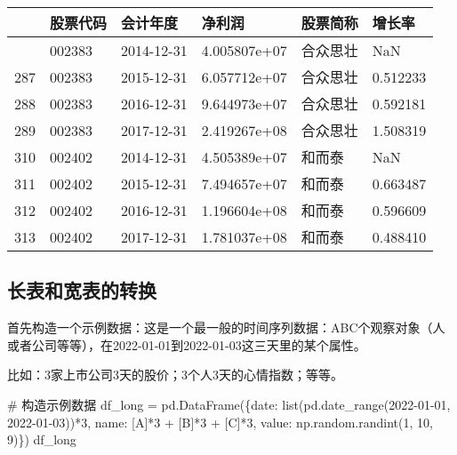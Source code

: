 \documentclass[
  letterpaper,
  DIV=11,
  numbers=noendperiod]{scrreprt}
\newenvironment{Shaded}{\begin{snugshade}}{\end{snugshade}}
\newcommand{\BuiltInTok}[1]{\textcolor[rgb]{0.00,0.23,0.31}{#1}}
\newcommand{\CommentTok}[1]{\textcolor[rgb]{0.37,0.37,0.37}{#1}}
\newcommand{\DecValTok}[1]{\textcolor[rgb]{0.68,0.00,0.00}{#1}}
\newcommand{\NormalTok}[1]{\textcolor[rgb]{0.00,0.23,0.31}{#1}}
\newcommand{\OperatorTok}[1]{\textcolor[rgb]{0.37,0.37,0.37}{#1}}
\newcommand{\StringTok}[1]{\textcolor[rgb]{0.13,0.47,0.30}{#1}}
\begin{document}
\begin{longtable}[]{@{}llllll@{}}
\toprule\noalign{}
& 股票代码 & 会计年度 & 净利润 & 股票简称 & 增长率 \\
\midrule\noalign{}
\endhead
\bottomrule\noalign{}
\endlastfoot
286 & 002383 & 2014-12-31 & 4.005807e+07 & 合众思壮 & NaN \\
287 & 002383 & 2015-12-31 & 6.057712e+07 & 合众思壮 & 0.512233 \\
288 & 002383 & 2016-12-31 & 9.644973e+07 & 合众思壮 & 0.592181 \\
289 & 002383 & 2017-12-31 & 2.419267e+08 & 合众思壮 & 1.508319 \\
310 & 002402 & 2014-12-31 & 4.505389e+07 & 和而泰 & NaN \\
311 & 002402 & 2015-12-31 & 7.494657e+07 & 和而泰 & 0.663487 \\
312 & 002402 & 2016-12-31 & 1.196604e+08 & 和而泰 & 0.596609 \\
313 & 002402 & 2017-12-31 & 1.781037e+08 & 和而泰 & 0.488410 \\
\end{longtable}

\hypertarget{ux957fux8868ux548cux5bbdux8868ux7684ux8f6cux6362}{%
\subsection{长表和宽表的转换}\label{ux957fux8868ux548cux5bbdux8868ux7684ux8f6cux6362}}

首先构造一个示例数据：这是一个最一般的时间序列数据：ABC个观察对象（人或者公司等等），在2022-01-01到2022-01-03这三天里的某个属性。

比如：3家上市公司3天的股价；3个人3天的心情指数；等等。

\begin{Shaded}
\begin{Highlighting}[]
\CommentTok{\# 构造示例数据}
\NormalTok{df\_long }\OperatorTok{=}\NormalTok{ pd.DataFrame(\{}\StringTok{\textquotesingle{}date\textquotesingle{}}\NormalTok{: }\BuiltInTok{list}\NormalTok{(pd.date\_range(}\StringTok{\textquotesingle{}2022{-}01{-}01\textquotesingle{}}\NormalTok{, }\StringTok{\textquotesingle{}2022{-}01{-}03\textquotesingle{}}\NormalTok{))}\OperatorTok{*}\DecValTok{3}\NormalTok{,}
                        \StringTok{\textquotesingle{}name\textquotesingle{}}\NormalTok{: [}\StringTok{\textquotesingle{}A\textquotesingle{}}\NormalTok{]}\OperatorTok{*}\DecValTok{3} \OperatorTok{+}\NormalTok{ [}\StringTok{\textquotesingle{}B\textquotesingle{}}\NormalTok{]}\OperatorTok{*}\DecValTok{3} \OperatorTok{+}\NormalTok{ [}\StringTok{\textquotesingle{}C\textquotesingle{}}\NormalTok{]}\OperatorTok{*}\DecValTok{3}\NormalTok{,}
                        \StringTok{\textquotesingle{}value\textquotesingle{}}\NormalTok{: np.random.randint(}\DecValTok{1}\NormalTok{, }\DecValTok{10}\NormalTok{, }\DecValTok{9}\NormalTok{)\})}
\NormalTok{df\_long}
\end{Highlighting}
\end{Shaded}
\end{document}

